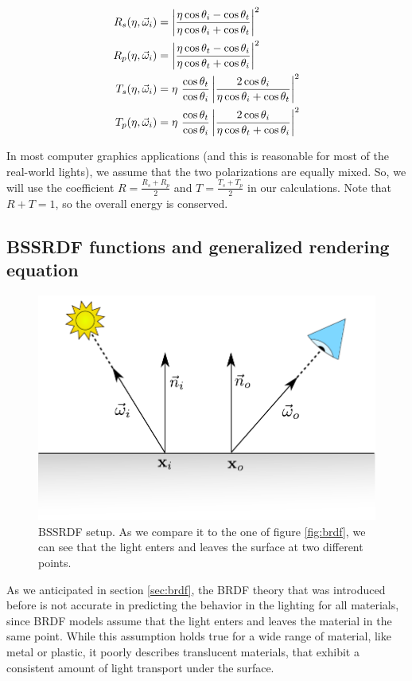 \begin{equation*}
\begin{split}
R_s(\eta,\vec{\omega}_i) &= \left|\frac{\eta  \cos\theta_i -  \cos\theta_t} {\eta  \cos\theta_i +  \cos\theta_t}\right|^2 \\
R_p(\eta,\vec{\omega}_i) &= \left|\frac{\eta  \cos\theta_t -  \cos\theta_i} {\eta  \cos\theta_t +  \cos\theta_i}\right|^2\\
T_s(\eta,\vec{\omega}_i) &= \eta \  \frac{ \cos\theta_t}{ \cos\theta_i} \left|\frac{2  \cos\theta_i}{\eta  \cos\theta_i +  \cos\theta_t}\right|^2 \\
T_p(\eta,\vec{\omega}_i) &= \eta \  \frac{ \cos\theta_t}{ \cos\theta_i}  \left|\frac{2  \cos\theta_i}{\eta  \cos\theta_t +  \cos\theta_i}\right|^2
\end{split}
\end{equation*}


In most computer graphics applications (and this is reasonable for most of the real-world lights), we assume that the two polarizations are equally mixed. So, we will use the coefficient $R = \frac{R_s + R_p}{2}$ and $T = \frac{T_s + T_p}{2}$ in our calculations. Note that $R + T = 1$, so the overall energy is conserved.

\subsection{BSSRDF functions and generalized rendering equation}
\begin{figure}
\centering
\includegraphics[width=0.8 \linewidth]{images/bssrdf} 
\caption{BSSRDF setup. As we compare it to the one of figure \ref{fig:brdf}, we can see that the light enters and leaves the surface at two different points.}
\label{fig:bssrdf}
\end{figure}

As we anticipated in section \ref{sec:brdf}, the BRDF theory that was introduced before is not accurate in predicting the behavior in the lighting for all materials, since BRDF models assume that the light enters and leaves the material in the same point. While this assumption holds true for a wide range of material, like metal or plastic, it poorly describes translucent materials, that exhibit a consistent amount of light transport under the surface. 

